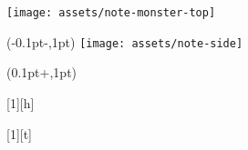 {\begin{textblock*}{\linewidth}
    \texttt{[image: assets/note-monster-top]}
  \end{textblock*}%
  \begin{textblock*}{\linewidth}(-0.1pt-\hbNoteBW,1pt)
    \texttt{[image: assets/note-side]}
  \end{textblock*}%
  \begin{textblock*}{\linewidth}(0.1pt+\hbNoteBoxWidth,1pt)
  \end{textblock*}%
  \usebox{\hbNoteBox}\vspace*{\hbNoteSBH}%
}

[1][h]{%
\hbNoteBefore%
\begin{figure}[#1]%
  \hbNoteMonsterDraw%
\end{figure}%
\hbNoteAfter%
}

[1][t]{%
\hbNoteBefore%
\begin{figure*}[#1]%
  \hbNoteMonsterDraw%
\end{figure*}%
\hbNoteAfter%
}

